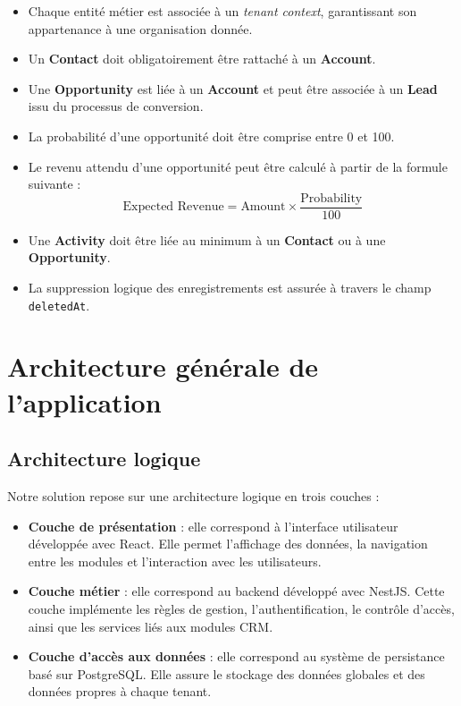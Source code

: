 \documentclass[12pt,a4paper]{report}
\begin{document}
\begin{itemize}
    \item Chaque entité métier est associée à un \textit{tenant context}, garantissant son appartenance à une organisation donnée.
    
    \item Un \textbf{Contact} doit obligatoirement être rattaché à un \textbf{Account}.
    
    \item Une \textbf{Opportunity} est liée à un \textbf{Account} et peut être associée à un \textbf{Lead} issu du processus de conversion.
    
    \item La probabilité d’une opportunité doit être comprise entre 0 et 100.
    
    \item Le revenu attendu d’une opportunité peut être calculé à partir de la formule suivante :
    \[
        \text{Expected Revenue} = \text{Amount} \times \frac{\text{Probability}}{100}
    \]
    
    \item Une \textbf{Activity} doit être liée au minimum à un \textbf{Contact} ou à une \textbf{Opportunity}.
    
    \item La suppression logique des enregistrements est assurée à travers le champ \texttt{deletedAt}.
\end{itemize}

\section{Architecture générale de l’application}

\subsection{Architecture logique}

Notre solution repose sur une architecture logique en trois couches :

\begin{itemize}
    \item \textbf{Couche de présentation} : elle correspond à l’interface utilisateur développée avec React. Elle permet l’affichage des données, la navigation entre les modules et l’interaction avec les utilisateurs.
    
    \item \textbf{Couche métier} : elle correspond au backend développé avec NestJS. Cette couche implémente les règles de gestion, l’authentification, le contrôle d’accès, ainsi que les services liés aux modules CRM.
    
    \item \textbf{Couche d’accès aux données} : elle correspond au système de persistance basé sur PostgreSQL. Elle assure le stockage des données globales et des données propres à chaque tenant.
\end{itemize}
\end{document}
